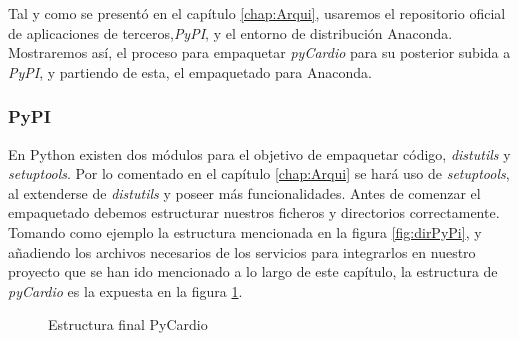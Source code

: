 Tal y como se presentó en el capítulo \ref{chap:Arqui}, usaremos el repositorio oficial de aplicaciones de terceros,\emph{PyPI}, y el entorno de distribución Anaconda. Mostraremos así, el proceso para empaquetar \emph{pyCardio} para su posterior subida a \emph{PyPI}, y partiendo de esta, el empaquetado para Anaconda.

\subsubsection*{PyPI}
En Python existen dos módulos para el objetivo de empaquetar código, \textit{distutils} y \textit{setuptools}. Por lo comentado en el capítulo \ref{chap:Arqui} se hará uso de \textit{setuptools}, al extenderse de \textit{distutils} y poseer más funcionalidades. Antes de comenzar el empaquetado debemos estructurar nuestros ficheros y directorios correctamente. Tomando como ejemplo la estructura mencionada en la figura \ref{fig:dirPyPi}, y añadiendo los archivos necesarios de los servicios para integrarlos en nuestro proyecto que se han ido mencionado a lo largo de este capítulo, la estructura de \emph{pyCardio} es la expuesta en la figura \ref{fig:pyCardioDir}. \\

\begin{figure}[h]
\centering
{}
\caption{Estructura final PyCardio}
\label{fig:pyCardioDir}
\end{figure}

